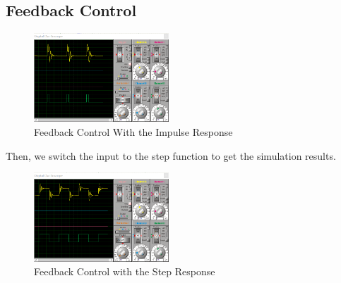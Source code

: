 \documentclass{article}
\begin{document}
{{    \subsection{Feedback Control}
    {
        \begin{figure}[H]
            \begin{small}
                \begin{center}
                    \includegraphics[width=0.45\textwidth]{figures/lab3_8.png}
                \end{center}
                \caption{Feedback Control With the Impulse Response}
                \label{fig:fig3_8}
            \end{small}
        \end{figure}
        Then, we switch the input to the step function to get the simulation results.
        \begin{figure}[H]
            \begin{small}
                \begin{center}
                    \includegraphics[width=0.45\textwidth]{figures/lab3_9.png}
                \end{center}
                \caption{Feedback Control with the Step Response}
                \label{fig:lab3_7}
            \end{small}
        \end{figure}
    }

}

}
\end{document}

